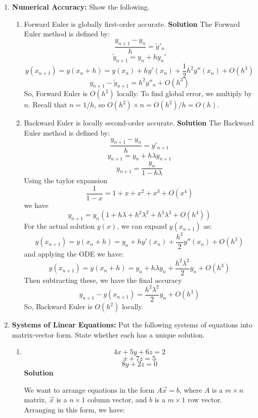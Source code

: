 \documentclass[letterpaper, fontsize=11pt]{scrartcl} %
\numberwithin{equation}{section} %
\numberwithin{figure}{section} %
\numberwithin{table}{section} %
\begin{document}
\begin{enumerate}
\begin{enumerate}
\end{enumerate}

\item \textbf{Numerical Accuracy:} Show the following.
\begin{enumerate}
\item Forward Euler is globally first-order accurate. \newline
\textbf{Solution} \newline
The Forward Euler method is defined by:
$$\frac{y_{n+1} - y_n}{h} = \tilde{y}'_n$$
$$\tilde{y}_{n+1} = y_n + hy_n'$$
$$y(x_{n+1}) = y(x_n + h) = y(x_n) + hy'(x_n) + \frac{1}{2}h^2 y''(x_n) + O(h^3)$$
$$y_{n+1} - \tilde{y}_{n+1} = h^2 y''_n + O(h^3)$$
So, Forward Euler is $O(h^2)$ locally. To find global error, we multiply by $n$. Recall that $n = 1/h$, so $O(h^2) \times n = O(h^2)/h = O(h)$.

\item Backward Euler is locally second-order accurate.\newline
\textbf{Solution} \newline
The Backward Euler method is defined by:
$$\frac{y_{n+1} - y_n}{h} =y'_{n+1}$$
$$y_{n+1} = y_n + h\lambda y_{n+1}$$
$$y_{n+1} = \frac{y_n}{1-h\lambda}$$
Using the taylor expansion
$$\frac{1}{1-x} = 1 + x + x^2 + x^3 + O(x^4)$$
we have
$$ y_{n+1} = y_n(1 + h\lambda + h^2\lambda^2 + h^3\lambda^3 + O(h^4))$$
For the actual solution $y(x)$, we can expand $y(x_{n+1})$ as:
$$y(x_{n+1}) = y(x_n + h) = y_n + hy'(x_n) + \frac{h^2}{2} y''(x_n) + O(h^3)$$
and applying the ODE we have:
$$y(x_{n+1}) = y(x_n + h) = y_n + h\lambda y_n + \frac{h^2 \lambda^2 }{2}y_n + O(h^3)$$
Then subtracting these, we have the final accuracy
$$y_{n+1} - y(x_{n+1}) = \frac{h^2\lambda^2}{2} y_n + O(h^3)$$
So, Backward Euler is $O(h^2)$ locally. 

\end{enumerate}

\item \textbf{Systems of Linear Equations:} Put the following systems of equations into matrix-vector form. State whether each has a unique solution. 
\begin{enumerate}
\item $$ 4x + 5y + 6z = 2$$
$$x + 7z = 5$$
$$8y + 2z = 0$$
\textbf{Solution} \newline
\par We want to arrange equations in the form $A\vec{x} = b$, where $A$ is a $m\times n$ matrix, $\vec{x}$ is a $n\times 1$ column vector, and $b$ is a $m\times 1$ row vector. Arranging in this form, we have:


\end{enumerate}
\end{enumerate}
\end{document}
